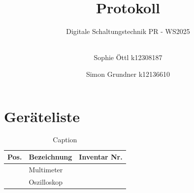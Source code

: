 \documentclass[
    a4paper,
    oneside,
    10pt,
    ngerman
]{scrartcl}
\newcounter{magicrownumbers}
\newcommand\rownumber{\stepcounter{magicrownumbers}\arabic{magicrownumbers}}
\begin{document}

\title{Protokoll}

\subtitle{Digitale Schaltungstechnik PR - WS2025\\%
	\hfill\\%
}

\author{%
    Sophie Öttl \authornewline
    k12308187 \and
	Simon Grundner \authornewline
    k12136610 \and
	\authornewline
	\authornewline
	\authornewline
}

\maketitle



\cleardoubleoddpage
\tableofcontents

\cleardoubleoddpage

\section*{Geräteliste}

\begin{table}[h]
    \centering
    \caption{Caption}
    \label{tab:geraeteliste}
    \begin{tabularx}{\textwidth}{rXX}
    \toprule
    Pos. & Bezeichnung & Inventar Nr.\\ \midrule
    \rownumber & Multimeter & \\
    \rownumber & Oszilloskop & \\
    \bottomrule
    \end{tabularx}
\end{table}









\end{document}
